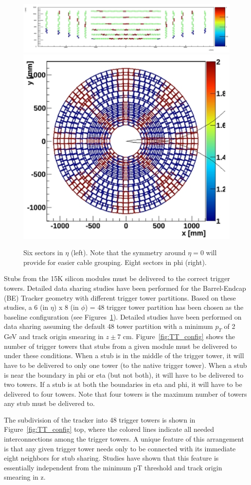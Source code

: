 \begin{figure}[ht!]
\centering
\includegraphics[width=0.75\columnwidth]{Plots/SecDef_RZ.eps}
\includegraphics[width=0.2\columnwidth]{Plots/SecDef_XY.eps}
\caption{Six sectors in $\eta$ (left). Note that the symmetry around $\eta=0$ will provide for easier cable grouping. Eight sectors in phi (right).}
\label{fig:SecDef_RZ}
\end{figure}

\noindent 
Stubs from the 15K silicon modules must be delivered to the correct trigger towers.  Detailed data sharing studies have been performed for the Barrel-Endcap (BE) Tracker geometry with different trigger tower partitions.  Based on these studies, a 6 (in $\eta$) x 8 (in $\phi$) = 48 trigger tower partition has been chosen as the baseline configuration (see Figures~\ref{fig:SecDef_RZ}). Detailed studies have been performed on data sharing assuming the default 48 tower partition with a minimum $p_T$ of 2 GeV and track origin smearing in $z\pm 7$ cm. Figure~\ref{fig:TT_config} shows the number of trigger towers that stubs from a given module must be delivered to under these conditions. When a stub is in the middle of the trigger tower, it will have to be delivered to only one tower (to the native trigger tower). When a stub is near the boundary in phi or eta (but not both), it will have to be delivered to two towers. If a stub is at both the boundaries in eta and phi, it will have to be delivered to four towers. Note that four towers is the maximum number of towers any stub must be delivered to. 


\noindent The subdivision of the tracker into 48 trigger towers is shown in Figure~\ref{fig:TT_config} top, where the colored lines indicate all needed interconnections among the trigger towers. 
A unique feature of this arrangement is that any given trigger tower needs only to be connected with its immediate eight neighbors for stub sharing.  Studies have shown that this feature is essentially independent from the minimum pT threshold and track origin smearing in z. 

